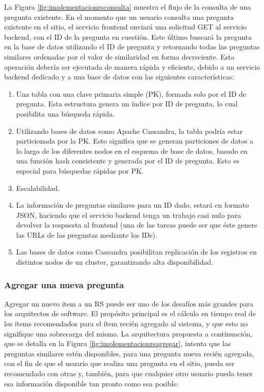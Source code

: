 La Figura \ref{fig:implementacionrsconsulta} muestra el flujo de la consulta de una pregunta existente. En el momento que un usuario consulta una pregunta existente en el sitio, el servicio frontend enviará una solicitud GET al servicio backend, con el ID de la pregunta en cuestión. Este último buscará la pregunta en la base de datos utilizando el ID de pregunta y retornando todas las preguntas similares ordenadas por el valor de similaridad en forma decreciente. Esta operación debería ser ejecutada de manera rápida y eficiente, debido a un servicio backend dedicado y a una base de datos con las siguientes características:
\begin{enumerate}
	\item Una tabla con una clave primaria simple (PK), formada solo por el ID de pregunta. Esta estructura genera un índice por ID de pregunta, lo cual posibilita una búsqueda rápida.
	\item Utilizando bases de datos como Apache Cassandra,  la tabla podría estar particionada por la PK. Esto significa que se generan particiones de datos a lo largo de los diferentes nodos en el esquema de base de datos, basado en una función hash consistente y generada por el ID de pregunta. Esto es especial para búsquedas rápidas por PK.
	\item Escalabilidad.
	\item La información de preguntas similares para un ID dado, estará en formato JSON, haciendo que el servicio backend tenga un trabajo casi nulo para devolver la respuesta al frontend (una de las tareas puede ser que éste genere las URLs de las preguntas mediante los IDs).
	\item Las bases de datos como Cassandra posibilitan replicación de los registros en distintos nodos de un cluster, garantizando alta disponibilidad.
\end{enumerate}

\subsubsection{Agregar una nueva pregunta}
Agregar un nuevo item a un RS puede ser uno de los desafíos más grandes para los arquitectos de software. El propósito principal es el cálculo en tiempo real de los ítems recomendados para el ítem recién agregado al sistema, y que esto no signifique una sobrecarga del mismo. La arquitectura propuesta a continuación, que se detalla en la Figura \ref{fig:implementacionrsagregar}, intenta que las preguntas similares estén disponibles, para una pregunta nueva recién agregada, con el fin de que el usuario que realiza una pregunta en el sitio, pueda ser recomendado con otras y, también, para que cualquier otro usuario pueda tener esa información disponible tan pronto como sea posible.

